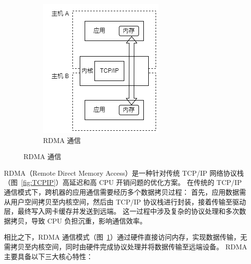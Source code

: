 {\begin{figure}[!htbp]
\begin{subfigure}[b]{0.40\textwidth}
            \includegraphics[width=\textwidth]{Img/RDMA.png}
            \caption{RDMA 通信}
            \label{fig:RDMA}
        \end{subfigure}
        \label{fig:DMA-RDMA}
    \end{figure}

    RDMA（Remote Direct Memory Access）是一种针对传统 TCP/IP 网络协议栈（图~\ref{fig:TCPIP}）高延迟和高 CPU 开销问题的优化方案。
    在传统的 TCP/IP 通信模式下，跨机器的应用通信需要经历多个数据拷贝过程：
    首先，应用数据需从用户空间拷贝至内核空间，然后由 TCP/IP 协议栈进行封装，接着传输至驱动层，最终写入网卡缓存并发送到远端。
    这一过程中涉及复杂的协议处理和多次数据拷贝，导致 CPU 负担沉重，影响通信效率。

    相比之下，RDMA 通信模式（图~\ref{fig:RDMA}）通过硬件直接访问内存，实现数据传输，无需拷贝至内核空间，同时由硬件完成协议处理并将数据传输至远端设备。
    RDMA 主要具备以下三大核心特性：

}
